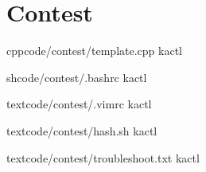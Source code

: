 \chapter{Contest}

{}{}
{cpp}{code/contest/template.cpp}
{kactl}

{}{}
{sh}{code/contest/.bashrc}
{kactl}

{}{}
{text}{code/contest/.vimrc}
{kactl}

{}{}
{text}{code/contest/hash.sh}
{kactl}

{}{}
{text}{code/contest/troubleshoot.txt}
{kactl}
